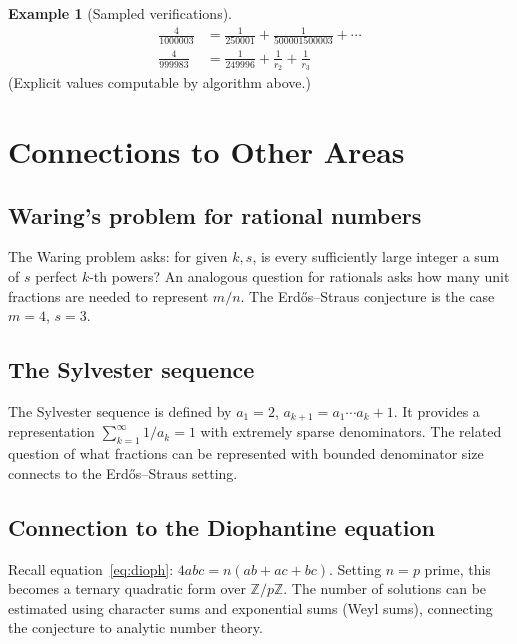 \documentclass[12pt,a4paper]{amsart}
\theoremstyle{definition}
\newtheorem{example}[theorem]{Example}
\newcommand{\Z}{\mathbb{Z}}
\begin{document}
\begin{example}[Sampled verifications]
\begin{align*}
  \frac{4}{1000003} &= \frac{1}{250001} + \frac{1}{500001500003} + \cdots \\
  \frac{4}{999983} &= \frac{1}{249996} + \frac{1}{r_2} + \frac{1}{r_3}
\end{align*}
(Explicit values computable by algorithm above.)
\end{example}

\section{Connections to Other Areas}

\subsection{Waring's problem for rational numbers}

The Waring problem asks: for given $k, s$, is every sufficiently large
integer a sum of $s$ perfect $k$-th powers?  An analogous question for
rationals asks how many unit fractions are needed to represent $m/n$.
The Erd\H{o}s--Straus conjecture is the case $m = 4$, $s = 3$.

\subsection{The Sylvester sequence}

The Sylvester sequence is defined by $a_1 = 2$, $a_{k+1} = a_1 \cdots a_k + 1$.
It provides a representation $\sum_{k=1}^{\infty} 1/a_k = 1$ with
extremely sparse denominators.  The related question of what fractions
can be represented with bounded denominator size connects to the
Erd\H{o}s--Straus setting.

\subsection{Connection to the Diophantine equation}

Recall equation~\eqref{eq:dioph}: $4abc = n(ab + ac + bc)$.
Setting $n = p$ prime, this becomes a ternary quadratic form over $\Z/p\Z$.
The number of solutions can be estimated using character sums and exponential
sums (Weyl sums), connecting the conjecture to analytic number theory.
\end{document}
